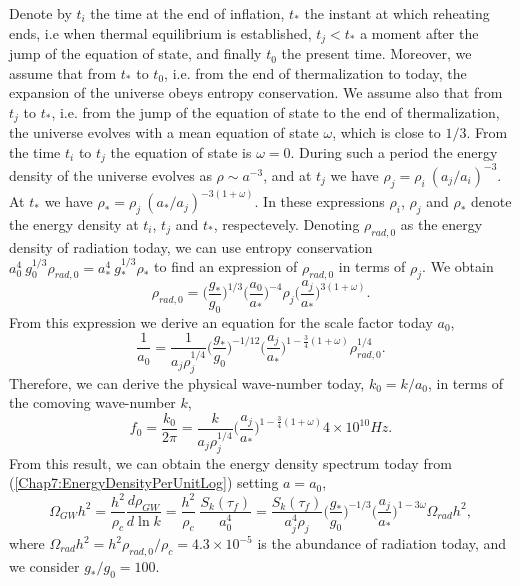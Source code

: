 \documentclass[11pt,a4paper,twoside]{book}
\begin{document}
Denote by $ t_{i} $ the time at the end of inflation, $ t_{*} $ the instant at which reheating ends, i.e when thermal equilibrium is established, $ t_{j} < t_{*} $ a moment after the jump of the equation of state, and finally $ t_{0} $ the present time. Moreover, we assume that from $ t_{*} $ to $ t_{0} $, i.e. from the end of thermalization to today, the expansion of the universe obeys entropy conservation. We assume also that from $ t_{j} $ to $ t_{*} $, i.e. from the jump of the equation of state to the end of thermalization, the universe evolves with a mean equation of state $\omega$, which is close to $ 1/3 $.
From the time $ t_{i} $ to $ t_{j} $ the equation of state is $\omega = 0$. During such a period the energy density of the universe evolves as $\rho \sim a^{-3}$, and at $ t_{j} $ we have $\rho_{j}=\rho_{i}\ (a_{j}/a_{i})^{-3}$. At $ t_{*} $ we have $ \rho_{*}=\rho_{j}\ (a_{*}/a_{j})^{-3(1+\omega)} $. In these expressions $\rho_{i}$, $ \rho_{j} $ and $ 	\rho_{*} $ denote the energy density at $ t_{i} $, $ t_{j} $ and $ t_{*} $, respectevely. Denoting $\rho_{rad,0}$ as the energy density of radiation today, we can use entropy conservation $ a_{0}^{4}\ g_{0}^{1/3}\rho_{rad,0}=a_{*}^{4}\ g_{*}^{1/3}\rho_{*} $ to find an expression of $\rho_{rad,0}$ in terms of $ \rho_{j} $. We obtain 
\begin{equation}
\label{Chap7:ExpressionEnergyDensity}
\rho_{rad,0}=\Bigg(\frac{g_{*}}{g_{0}}\Bigg)^{1/3}\Bigg(\frac{a_{0}}{a_{*}}\Bigg)^{-4}\rho_{j}\Bigg(\frac{a_{j}}{a_{*}}\Bigg)^{3(1+\omega)}.
\end{equation}
From this expression we derive an equation for the scale factor today $ a_{0} $,
\begin{equation}
\label{Chap7:scaleFactorToday}
\frac{1}{a_{0}}= \frac{1}{a_{j}\rho_{j}^{1/4}}\Bigg(\frac{g_{*}}{g_{0}}\Bigg)^{-1/12}\Bigg(\frac{a_{j}}{a_{*}}\Bigg)^{1-\frac{3}{4}(1+\omega)}\rho_{rad,0}^{1/4}.
\end{equation}
Therefore, we can derive the physical wave-number today, $ k_{0}=k/a_{0} $, in terms of the comoving wave-number $ k $,
\begin{equation}
\label{Chap7:frequencyToday}
f_{0}=\frac{k_{0}}{2\pi}=\frac{k}{a_{j}\rho_{j}^{1/4}}\Bigg(\frac{a_{j}}{a_{*}}\Bigg)^{1-\frac{3}{4}(1+\omega)} 4 \times 10^{10} Hz.
\end{equation}
From this result, we can obtain the energy density spectrum today from (\ref{Chap7:EnergyDensityPerUnitLog}) setting $ a=a_{0} $,
\begin{equation}
\label{Chap7spectrumToday}
\Omega_{GW}h^{2}=\frac{h^{2}}{\rho_{c}}\frac{d\rho_{GW}}{d\ln k}
= \frac{h^{2}}{\rho_{c}}\ \frac{S_{k}(\tau_{f})}{a_{0}^{4}}
=\frac{S_{k}(\tau_{f})}{a_{j}^{4}\rho_{j}}\Bigg(\frac{g_{*}}{g_{0}}\Bigg)^{-1/3}\Bigg(\frac{a_{j}}{a_{*}}\Bigg)^{1-3\omega}\Omega_{rad}h^{2},
\end{equation}
where $\Omega_{rad}h^{2} = h^{2} \rho_{rad,0}/\rho_{c} = 4.3 \times 10^{-5}$ is the abundance of radiation today, and we consider $ g_{*}/g_{0}=100 $.
\end{document}
